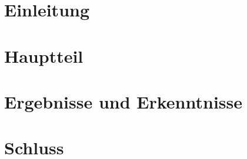 \documentclass[a4paper,12pt,fleqn]{scrbook}
\begin{document}
\frontmatter 

\setlength{\headheight}{36pt}

\begin{titlepage}



\end{titlepage}


%
\tableofcontents 
%

%



\mainmatter 
%
\chapter{Einleitung}
\lipsum[1]


\chapter{Hauptteil}
\lipsum[1]


\chapter{Ergebnisse und Erkenntnisse}
\lipsum[1]


\chapter{Schluss}
\lipsum[1]




\newpage




\end{document}
